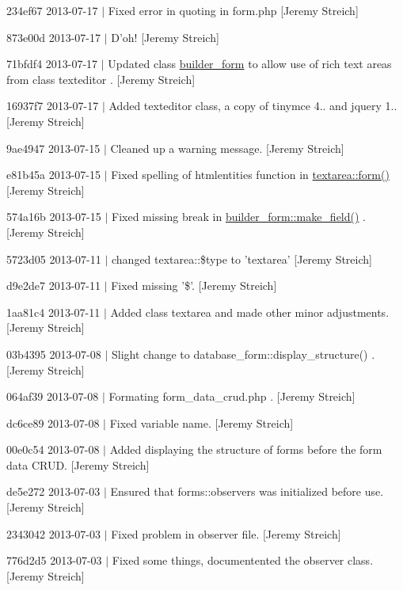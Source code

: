 \begin{DoxyItemize}
\item 234ef67 2013-\/07-\/17 $|$ Fixed error in quoting in form.\-php \mbox{[}Jeremy Streich\mbox{]}
\item 873e00d 2013-\/07-\/17 $|$ D'oh! \mbox{[}Jeremy Streich\mbox{]}
\item 71bfdf4 2013-\/07-\/17 $|$ Updated class \hyperlink{classbuilder__form}{builder\-\_\-form} to allow use of rich text areas from class texteditor . \mbox{[}Jeremy Streich\mbox{]}
\item 16937f7 2013-\/07-\/17 $|$ Added texteditor class, a copy of tinymce 4.. and jquery 1.. \mbox{[}Jeremy Streich\mbox{]}
\item 9ae4947 2013-\/07-\/15 $|$ Cleaned up a warning message. \mbox{[}Jeremy Streich\mbox{]}
\item e81b45a 2013-\/07-\/15 $|$ Fixed spelling of htmlentities function in \hyperlink{classtextarea_a3e3d02a7c0ff76c86f6b987e1193ca6a}{textarea\-::form()} \mbox{[}Jeremy Streich\mbox{]}
\item 574a16b 2013-\/07-\/15 $|$ Fixed missing break in \hyperlink{classbuilder__form_a6408926fe73438032738d8a0095acf8d}{builder\-\_\-form\-::make\-\_\-field()} . \mbox{[}Jeremy Streich\mbox{]}
\item 5723d05 2013-\/07-\/11 $|$ changed textarea\-::\$type to 'textarea' \mbox{[}Jeremy Streich\mbox{]}
\item d9e2de7 2013-\/07-\/11 $|$ Fixed missing '\$'. \mbox{[}Jeremy Streich\mbox{]}
\item 1aa81c4 2013-\/07-\/11 $|$ Added class textarea and made other minor adjustments. \mbox{[}Jeremy Streich\mbox{]}
\item 03b4395 2013-\/07-\/08 $|$ Slight change to database\-\_\-form\-::display\-\_\-structure() . \mbox{[}Jeremy Streich\mbox{]}
\item 064af39 2013-\/07-\/08 $|$ Formating form\-\_\-data\-\_\-crud.\-php . \mbox{[}Jeremy Streich\mbox{]}
\item dc6ce89 2013-\/07-\/08 $|$ Fixed variable name. \mbox{[}Jeremy Streich\mbox{]}
\item 00e0c54 2013-\/07-\/08 $|$ Added displaying the structure of forms before the form data C\-R\-U\-D. \mbox{[}Jeremy Streich\mbox{]}
\item de5e272 2013-\/07-\/03 $|$ Ensured that forms\-::observers was initialized before use. \mbox{[}Jeremy Streich\mbox{]}
\item 2343042 2013-\/07-\/03 $|$ Fixed problem in observer file. \mbox{[}Jeremy Streich\mbox{]}
\item 776d2d5 2013-\/07-\/03 $|$ Fixed some things, documentented the observer class. \mbox{[}Jeremy Streich\mbox{]}

\end{DoxyItemize}
